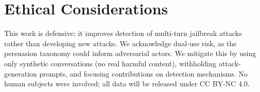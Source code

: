 \section*{Ethical Considerations}

This work is defensive: it improves detection of multi-turn jailbreak attacks rather than developing new attacks. We acknowledge dual-use risk, as the persuasion taxonomy could inform adversarial actors. We mitigate this by using only synthetic conversations (no real harmful content), withholding attack-generation prompts, and focusing contributions on detection mechanisms. No human subjects were involved; all data will be released under CC BY-NC 4.0.
